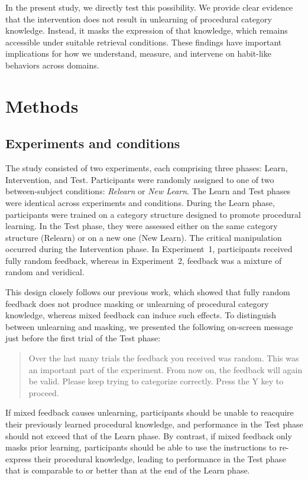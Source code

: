 \documentclass{article}
\begin{document}
In the present study, we directly test this possibility. We
provide clear evidence that the intervention does not result
in unlearning of procedural category knowledge. Instead, it
masks the expression of that knowledge, which remains
accessible under suitable retrieval conditions. These
findings have important implications for how we understand,
measure, and intervene on habit-like behaviors across
domains.

\section{Methods}

\subsection{Experiments and conditions}
The study consisted of two experiments, each comprising
three phases: Learn, Intervention, and Test. Participants
were randomly assigned to one of two between-subject
conditions: \textit{Relearn} or \textit{New Learn}. The
Learn and Test phases were identical across experiments and
conditions. During the Learn phase, participants were
trained on a category structure designed to promote
procedural learning. In the Test phase, they were assessed
either on the same category structure (Relearn) or on a new
one (New Learn). The critical manipulation occurred during
the Intervention phase. In Experiment~1, participants
received fully random feedback, whereas in Experiment~2,
feedback was a mixture of random and veridical.

This design closely follows our previous work, which showed
that fully random feedback does not produce masking or
unlearning of procedural category knowledge, whereas mixed
feedback can induce such effects. To distinguish between
unlearning and masking, we presented the following on-screen
message just before the first trial of the Test phase:

\begin{quote}
Over the last many trials the feedback you received was
random. This was an important part of the experiment. From
now on, the feedback will again be valid. Please keep trying
to categorize correctly. Press the Y key to proceed.
\end{quote}

If mixed feedback causes unlearning, participants should be
unable to reacquire their previously learned procedural
knowledge, and performance in the Test phase should not
exceed that of the Learn phase. By contrast, if mixed
feedback only masks prior learning, participants should be
able to use the instructions to re-express their procedural
knowledge, leading to performance in the Test phase that is
comparable to or better than at the end of the Learn phase.
\end{document}
